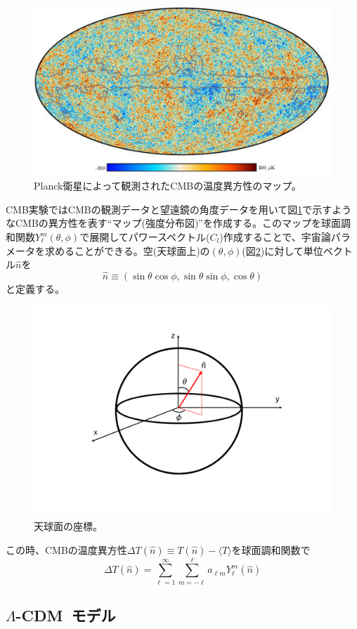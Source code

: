 \begin{figure}[htbp]
  \centering
  \includegraphics[width=0.85\columnwidth]{2_cosmology/figs/planck_T_map_single.png}
  \caption{Planck衛星によって観測されたCMBの温度異方性のマップ。}
  \label{Planck_T}
\end{figure}
CMB実験ではCMBの観測データと望遠鏡の角度データを用いて図\ref{Planck_T}で示すようなCMBの異方性を表す``マップ(強度分布図)''を作成する。このマップを球面調和関数$Y^{m}_{\ell}(\theta,\phi)$で展開してパワースペクトル($C_{l}$)作成することで、宇宙論パラメータを求めることができる。空(天球面上)の$(\theta,\phi)$(図\ref{kyuuzahyou})に対して単位ベクトル$\hat{n}$を
\begin{equation}
  \hat{n} \equiv (\sin\theta\cos\phi,\sin\theta\sin\phi,\cos\theta)
\end{equation}
と定義する。
\begin{figure}[htbp]
  \centering
  \includegraphics[width=0.5\columnwidth]{2_cosmology/figs/kyuuzahyou.pdf}
  \caption{天球面の座標。}
  \label{kyuuzahyou}
\end{figure}
この時、CMBの温度異方性$\Delta T(\hat{n})\equiv T(\hat{n}) - \langle T \rangle$を球面調和関数で
\begin{equation}
  \Delta T(\hat{n}) = \sum_{\ell=1}^{\infty}\sum_{m=-\ell}^{\ell}a_{\ell m}Y^{m}_{\ell}(\hat{n})
\end{equation}

\subsection{$\Lambda$-CDM~モデル}

